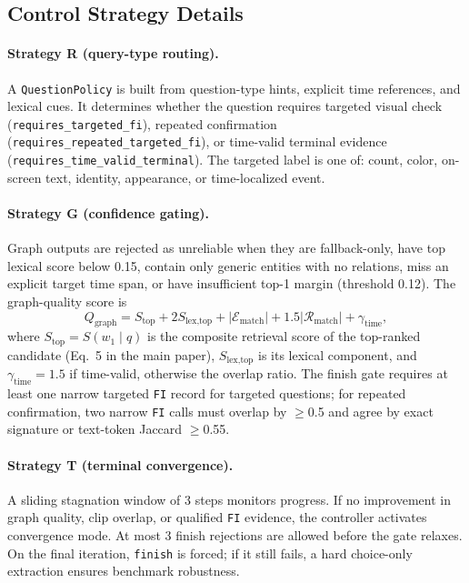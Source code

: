 \documentclass[sigconf, screen, review, anonymous]{acmart}
\newcommand{\code}[1]{\texttt{\nolinkurl{#1}}}
\begin{document}
\subsection{Control Strategy Details}
\label{sec:prompts-control}

\paragraph{Strategy R (query-type routing).}
A \code{QuestionPolicy} is built from question-type hints, explicit time
references, and lexical cues. It determines whether the question requires
targeted visual check (\code{requires_targeted_fi}), repeated confirmation
(\code{requires_repeated_targeted_fi}), or time-valid terminal evidence
(\code{requires_time_valid_terminal}). The targeted label is one of: count,
color, on-screen text, identity, appearance, or time-localized event.

\paragraph{Strategy G (confidence gating).} Graph outputs are rejected as unreliable when they are fallback-only, have top lexical score below 0.15, contain only generic entities with no relations, miss an explicit target time span, or have insufficient top-1 margin (threshold 0.12). The graph-quality score is
\begin{equation}
Q_{\text{graph}} = S_{\text{top}} + 2 S_{\text{lex,top}} + |\mathcal{E}_{\text{match}}| + 1.5 |\mathcal{R}_{\text{match}}| + \gamma_{\text{time}},
\end{equation}
where $S_{\text{top}} = S(w_1 \mid q)$ is the composite retrieval score of the top-ranked candidate (Eq.~5 in the main paper), $S_{\text{lex,top}}$ is its lexical component, and $\gamma_{\text{time}}=1.5$ if time-valid, otherwise the overlap ratio. The finish gate requires at least one narrow targeted \texttt{FI} record for targeted questions; for repeated confirmation, two narrow \texttt{FI} calls must overlap by $\geq$0.5 and agree by exact signature or text-token Jaccard $\geq$0.55.

\paragraph{Strategy T (terminal convergence).}
A sliding stagnation window of 3 steps monitors progress. If no improvement in
graph quality, clip overlap, or qualified \code{FI} evidence, the controller
activates convergence mode. At most 3 finish rejections are allowed before the
gate relaxes. On the final iteration, \code{finish} is forced; if it still
fails, a hard choice-only extraction ensures benchmark robustness.
\end{document}
